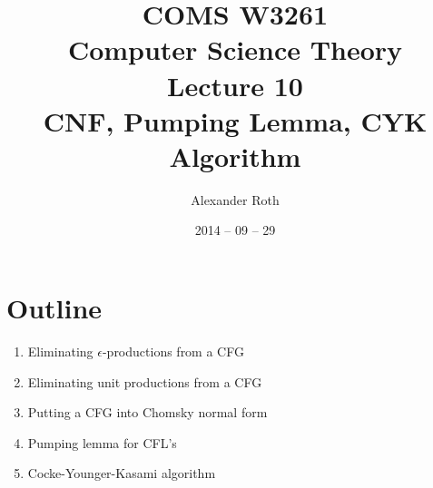 \documentclass[]{article}
\begin{document}
\newcommand*{\xml}[1]{\texttt{<#1>}}

\title{COMS W3261 \\ Computer Science Theory \\ Lecture 10\\ CNF, Pumping Lemma, 
CYK Algorithm}
\author{Alexander Roth}
\date{2014 -- 09 -- 29}
\maketitle

\section*{Outline}
  \begin{enumerate}
    \item Eliminating $\epsilon$-productions from a CFG
    \item Eliminating unit productions from a CFG
    \item Putting a CFG into Chomsky normal form
    \item Pumping lemma for CFL's
    \item Cocke-Younger-Kasami algorithm
  \end{enumerate}
    
\end{document}
